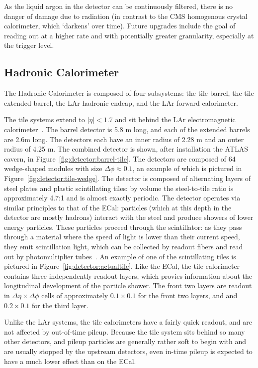 As the liquid argon in the detector can be continuously filtered, there is no danger of damage due to radiation (in contrast to the CMS homogenous crystal calorimeter, which `darkens' over time). Future upgrades include the goal of reading out at a higher rate and with potentially greater granularity, especially at the trigger level.



\subsection{Hadronic Calorimeter}

The Hadronic Calorimeter is composed of four subsystems: the tile barrel, the tile extended barrel, the LAr hadronic endcap, and the LAr forward calorimeter. 

The tile systems extend to $|\eta| < 1.7$ and sit behind the LAr electromagnetic calorimeter~\cite{ATLASPaper,Tile}. The barrel detector is 5.8 m long, and each of the extended barrels are 2.6m long. The detectors each have an inner radius of 2.28 m and an outer radius of 4.25 m. The combined detector is shown, after installation the ATLAS cavern, in Figure~\ref{fig:detector:barrel-tile}. The detectors are composed of 64 wedge-shaped modules with size $\Delta\phi \approx 0.1$, an example of which is pictured in Figure~\ref{fig:detector:tile-wedge}. The detector is composed of alternating layers of steel plates and plastic scintillating tiles: by volume the steel-to-tile ratio is approximately 4.7:1 and is almost exactly periodic. The detector operates via similar principles to that of the ECal: particles (which at this depth in the detector are mostly hadrons) interact with the steel and produce showers of lower energy particles. These particles proceed through the scintillator: as they pass through a material where the speed of light is lower than their current speed, they emit scintillation light, which can be collected by readout fibers and read out by photomultiplier tubes~\cite{Wigmans,Detectors,Tile}. An example of one of the scintillating tiles is pictured in Figure~\ref{fig:detector:actualtile}. Like the ECal, the tile calorimeter contains three independently readout layers, which provies information about the longitudinal development of the particle shower. The front two layers are readout in $\Delta \eta \times \Delta\phi$ cells of approximately  $0.1 \times 0.1$ for the front two layers, and and $0.2 \times 0.1$ for the third layer.

Unlike the LAr systems, the tile calorimeters have a fairly quick readout, and are not affected by out-of-time pileup. Because the tile system sits behind so many other detectors, and pileup particles are generally rather soft to begin with and are usually stopped by the upstream detectors, even in-time pileup is expected to have a much lower effect than on the ECal.

